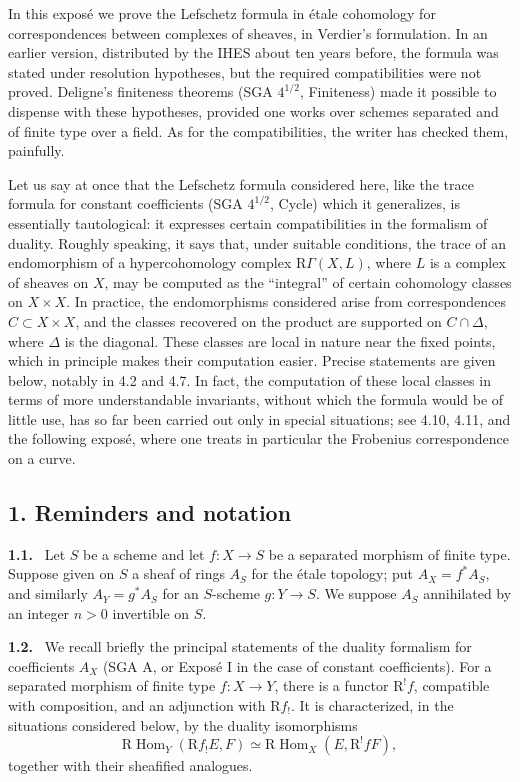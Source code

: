 \documentclass[12pt]{article}
\newcommand{\Hom}{\operatorname{Hom}}
\newcommand{\R}{\mathrm R}
\newenvironment{statement}[1]{\par\medskip\noindent\textbf{#1.}\ }{\par\medskip}
\begin{document}
In this exposé we prove the Lefschetz formula in étale cohomology for correspondences between complexes of sheaves, in Verdier's formulation. In an earlier version, distributed by the IHES about ten years before, the formula was stated under resolution hypotheses, but the required compatibilities were not proved. Deligne's finiteness theorems (SGA $4^{1/2}$, Finiteness) made it possible to dispense with these hypotheses, provided one works over schemes separated and of finite type over a field. As for the compatibilities, the writer has checked them, painfully.

Let us say at once that the Lefschetz formula considered here, like the trace formula for constant coefficients (SGA $4^{1/2}$, Cycle) which it generalizes, is essentially tautological: it expresses certain compatibilities in the formalism of duality. Roughly speaking, it says that, under suitable conditions, the trace of an endomorphism of a hypercohomology complex $\R\Gamma(X,L)$, where $L$ is a complex of sheaves on $X$, may be computed as the ``integral'' of certain cohomology classes on $X\times X$. In practice, the endomorphisms considered arise from correspondences $C\subset X\times X$, and the classes recovered on the product are supported on $C\cap\Delta$, where $\Delta$ is the diagonal. These classes are local in nature near the fixed points, which in principle makes their computation easier. Precise statements are given below, notably in 4.2 and 4.7. In fact, the computation of these local classes in terms of more understandable invariants, without which the formula would be of little use, has so far been carried out only in special situations; see 4.10, 4.11, and the following exposé, where one treats in particular the Frobenius correspondence on a curve.

\subsection*{1. Reminders and notation}

\begin{statement}{1.1}
Let $S$ be a scheme and let $f:X\to S$ be a separated morphism of finite type. Suppose given on $S$ a sheaf of rings $A_S$ for the étale topology; put $A_X=f^*A_S$, and similarly $A_Y=g^*A_S$ for an $S$-scheme $g:Y\to S$. We suppose $A_S$ annihilated by an integer $n>0$ invertible on $S$.
\end{statement}

\begin{statement}{1.2}
We recall briefly the principal statements of the duality formalism for coefficients $A_X$ (SGA A, or Exposé I in the case of constant coefficients). For a separated morphism of finite type $f:X\to Y$, there is a functor $\R^!f$, compatible with composition, and an adjunction with $\R f_!$. It is characterized, in the situations considered below, by the duality isomorphisms
\[
   \R\Hom_Y(\R f_!E,F)\simeq \R\Hom_X(E,\R^!fF),
\]
together with their sheafified analogues.
\end{statement}
\end{document}
